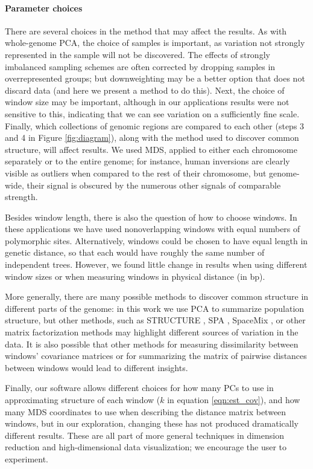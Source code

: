 \documentclass[11pt, oneside]{article}   	%
\begin{document}
\paragraph{Parameter choices}
There are several choices in the method that may affect the results.
As with whole-genome PCA,
the choice of samples is important,
as variation not strongly represented in the sample will not be discovered.
The effects of strongly imbalanced sampling schemes are often corrected by dropping samples in overrepresented groups;
but downweighting may be a better option that does not discard data
(and here we present a method to do this).
Next, the choice of window size may be important,
although in our applications results were not sensitive to this,
indicating that we can see variation on a sufficiently fine scale.
Finally, which collections of genomic regions are compared to each other (steps 3 and 4 in Figure \ref{fig:diagram}),
along with the method used to discover common structure,
will affect results.
We used MDS, applied to either each chromosome separately or to the entire genome;
for instance, human inversions are clearly visible as outliers when compared to the rest of their chromosome,
but genome-wide, their signal is obscured by the numerous other signals of comparable strength.

Besides window length, there is also the question of how to choose windows.
In these applications we have used nonoverlapping windows with equal numbers of polymorphic sites.
Alternatively, windows could be chosen to have equal length in genetic distance,
so that each would have roughly the same number of independent trees.
However, we found little change in results when using different window sizes
or when measuring windows in physical distance (in bp).

More generally, there are many possible methods to discover common structure in different parts of the genome:
in this work we use PCA to summarize population structure,
but other methods, such as STRUCTURE \citep{falush2003inference},
SPA \citep{yang2012modelbased},
SpaceMix \citep{bradburd2015spatial},
or other matrix factorization methods \citep{engelhardt2010analysis}
may highlight different sources of variation in the data.
It is also possible that other methods for measuring dissimilarity between windows' covariance matrices
or for summarizing the matrix of pairwise distances between windows
would lead to different insights.

Finally, our software allows different choices for how many PCs to use in approximating structure of each window ($k$ in equation \ref{eqn:est_cov}),
and how many MDS coordinates to use when describing the distance matrix between windows,
but in our exploration, changing these has not produced dramatically different results.
These are all part of more general techniques in dimension reduction and high-dimensional data visualization;
we encourage the user to experiment.
\end{document}
